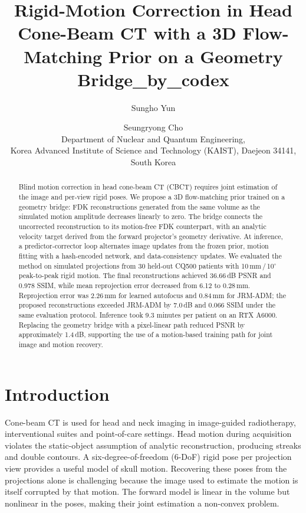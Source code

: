 \documentclass[11pt]{article}
\title{\bfseries Rigid-Motion Correction in Head Cone-Beam CT with a 3D Flow-Matching
Prior on a Geometry Bridge\_by\_codex}
\author{%
Sungho Yun \and Seungryong Cho\\[2pt]
{\normalsize Department of Nuclear and Quantum Engineering,}\\
{\normalsize Korea Advanced Institute of Science and Technology (KAIST), Daejeon 34141, South Korea}}
\date{}
\begin{document}
\maketitle

\begin{abstract}
\noindent
Blind motion correction in head cone-beam CT (CBCT) requires joint estimation of the
image and per-view rigid poses. We propose a 3D flow-matching prior trained on a geometry
bridge: FDK reconstructions generated from the same volume as the simulated motion
amplitude decreases linearly to zero. The bridge connects the uncorrected reconstruction
to its motion-free FDK counterpart, with an analytic velocity target derived from the
forward projector's geometry derivative. At inference, a predictor-corrector loop
alternates image updates from the frozen prior, motion fitting with a hash-encoded network,
and data-consistency updates. We evaluated the method on simulated projections from 30
held-out CQ500 patients with 10\,mm\,/\,10$^\circ$ peak-to-peak rigid motion. The final
reconstructions achieved 36.66\,dB PSNR and 0.978 SSIM, while mean reprojection error
decreased from 6.12 to 0.28\,mm. Reprojection error was 2.26\,mm for learned autofocus
and 0.84\,mm for JRM-ADM; the proposed reconstructions exceeded JRM-ADM by 7.0\,dB and
0.066 SSIM under the same evaluation protocol. Inference took 9.3 minutes per patient
on an RTX A6000. Replacing the geometry bridge with a pixel-linear path reduced PSNR
by approximately 1.4\,dB, supporting the use of a motion-based training path for joint
image and motion recovery.
\end{abstract}

\section{Introduction}
\label{sec:intro}

Cone-beam CT is used for head and neck imaging in image-guided radiotherapy,
interventional suites and point-of-care settings. Head motion during acquisition
violates the static-object assumption of analytic reconstruction, producing streaks and
double contours. A six-degree-of-freedom (6-DoF) rigid pose per projection view provides
a useful model of skull motion. Recovering these poses from the projections alone is
challenging because the image used to estimate the motion is itself corrupted by that
motion. The forward model is linear in the volume but nonlinear in the poses, making
their joint estimation a non-convex problem.
\end{document}
